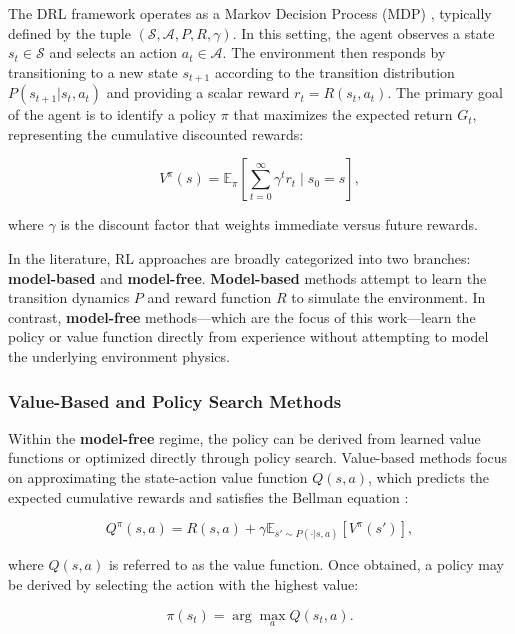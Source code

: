The DRL framework operates as a Markov Decision Process (MDP) \citep{bellman1957dp}, typically defined by the tuple $(\mathcal{S}, \mathcal{A}, P, R, \gamma)$. In this setting, the agent observes a state $s_t \in \mathcal{S}$ and selects an action $a_t \in \mathcal{A}$. The environment then responds by transitioning to a new state $s_{t+1}$ according to the transition distribution $P(s_{t+1}|s_t, a_t)$ and providing a scalar reward $r_t = R(s_t, a_t)$. The primary goal of the agent is to identify a policy $\pi$ that maximizes the expected return $G_t$, representing the cumulative discounted rewards:

\begin{equation} \label{eq:return}
V^\pi(s) = \mathbb{E}_\pi \left[ \sum_{t=0}^{\infty} \gamma^t r_t \mid s_0 = s \right],
\end{equation}

where $\gamma$ is the discount factor that weights immediate versus future rewards.

In the literature, RL approaches are broadly categorized into two branches: \textbf{model-based} and \textbf{model-free}. \textbf{Model-based} methods attempt to learn the transition dynamics $P$ and reward function $R$ to simulate the environment. In contrast, \textbf{model-free} methods—which are the focus of this work—learn the policy or value function directly from experience without attempting to model the underlying environment physics.

\subsubsection{Value-Based and Policy Search Methods}

Within the \textbf{model-free} regime, the policy can be derived from learned value functions or optimized directly through policy search. Value-based methods focus on approximating the state-action value function $Q(s,a)$, which predicts the expected cumulative rewards and satisfies the Bellman equation \citep{bellman1957dp}:

\begin{equation} \label{eq:bellman}
Q^\pi(s, a) = R(s, a) + \gamma \mathbb{E}_{s' \sim P(\cdot|s,a)} [V^\pi(s')],
\end{equation}

where $Q(s,a)$ is referred to as the value function. Once obtained, a policy may be derived by selecting the action with the highest value:

\begin{equation} \label{eq:policy_from_q}
\pi(s_t) = \arg\max_a Q(s_t, a).
\end{equation}


